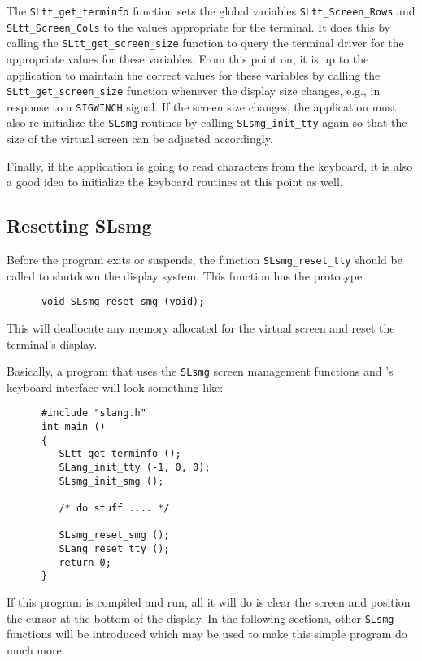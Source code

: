   The \verb|SLtt_get_terminfo| function sets the global variables
  \verb|SLtt_Screen_Rows| and \verb|SLtt_Screen_Cols| to the values
  appropriate for the terminal.  It does this by calling the
  \verb|SLtt_get_screen_size| function to query the terminal driver
  for the appropriate values for these variables.  From this point on,
  it is up to the application to maintain the correct values for these
  variables by calling the \verb|SLtt_get_screen_size| function
  whenever the display size changes, e.g., in response to a
  \verb|SIGWINCH| signal.  If the screen size changes, the application
  must also re-initialize the \verb|SLsmg| routines by calling
  \verb|SLsmg_init_tty| again so that the size of the virtual screen
  can be adjusted accordingly.

  Finally, if the application is going to read characters from the keyboard,
  it is also a good idea to initialize the keyboard routines at this point
  as well.

\subsection{Resetting SLsmg}  

  Before the program exits or suspends, the function \verb|SLsmg_reset_tty|
  should be called to shutdown the display system.  This function has the
  prototype
\begin{verbatim} 
      void SLsmg_reset_smg (void);
\end{verbatim}
  This will deallocate any memory allocated for the virtual screen and
  reset the terminal's display.
  
  Basically, a program that uses the \verb|SLsmg| screen management functions
  and \slang's keyboard interface will look something like:
\begin{verbatim}  
      #include "slang.h"
      int main ()
      {
         SLtt_get_terminfo ();
         SLang_init_tty (-1, 0, 0);
         SLsmg_init_smg ();
         
         /* do stuff .... */
    
         SLsmg_reset_smg ();
         SLang_reset_tty ();
         return 0;
      }
\end{verbatim}
  If this program is compiled and run, all it will do is clear the screen
  and position the cursor at the bottom of the display.  In the following
  sections, other \verb|SLsmg| functions will be introduced which may be used
  to make this simple program do much more.

